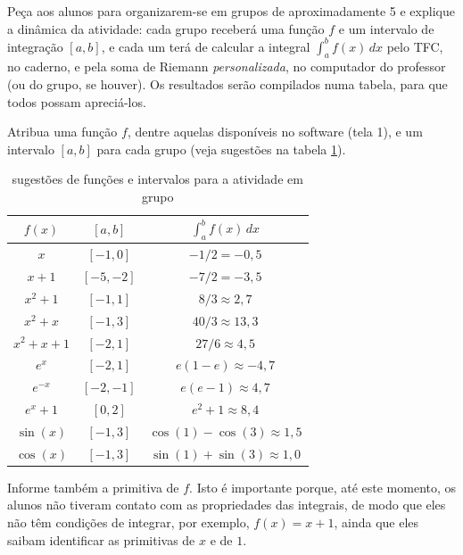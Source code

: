 \documentclass[a4paper,12pt]{scrartcl}
\begin{document}
      \begin{list}{.}{
	\setlength\leftmargin{0cm}%
	\setlength\itemindent\parindent%
	\setlength\listparindent{\parindent}%
        \setlength{}%
        \setlength{}%
      }
      
	\item Peça aos alunos para organizarem-se em grupos de aproximadamente 5 e explique a dinâmica da atividade:
	cada grupo receberá uma função $f$ e um intervalo de integração $[a,b]$, e cada um terá de calcular a integral $\int_a^b f(x)\,dx$
	pelo TFC, no caderno, e pela soma de Riemann \emph{personalizada}, no computador do professor (ou do grupo, se houver).
	Os resultados serão compilados numa tabela, para que todos possam apreciá-los.
	
	\item Atribua uma função $f$, dentre aquelas disponíveis no software (tela 1), e um intervalo $[a,b]$ para cada grupo (veja sugestões na tabela \ref{tab:parte3}).
	
	\begin{table}
	  \centering
	  \caption{sugestões de funções e intervalos para a atividade em grupo}
	  \label{tab:parte3}
	  \begin{tabular}{ccc}
	    \toprule
	    $f(x)$    & $[a,b]$   & $\int_a^b f(x)\, dx$ \\
	    \midrule
	    $x$       & $[-1,0]$  & $-1/2 = -0,5$ \\
	    $x+1$     & $[-5,-2]$ & $-7/2 = -3,5$ \\
	    $x^2+1$   & $[-1,1]$  & $8/3 \approx 2,7$ \\
	    $x^2+x$   & $[-1,3]$  & $40/3 \approx 13,3$ \\
	    $x^2+x+1$ & $[-2,1]$  & $27/6 \approx 4,5$ \\
	    $e^x$     & $[-2,1]$  & $e(1-e) \approx -4,7$ \\
	    $e^{-x}$  & $[-2,-1]$ & $e(e-1) \approx 4,7$ \\
	    $e^x+1$   & $[0,2]$   & $e^2+1 \approx 8,4$ \\
	    $\sin(x)$ & $[-1,3]$  & $\cos(1)-\cos(3) \approx 1,5$ \\
	    $\cos(x)$ & $[-1,3]$  & $\sin(1)+\sin(3) \approx 1,0$ \\
	    \bottomrule
	  \end{tabular}
	\end{table}
	
	Informe também a primitiva de $f$. Isto é importante porque, até este momento, os alunos não tiveram contato com as propriedades das integrais,
	de modo que eles não têm condições de integrar, por exemplo, $f(x) = x + 1$, ainda que eles saibam identificar as primitivas de $x$ e de $1$.
	

\end{list}
\end{document}
